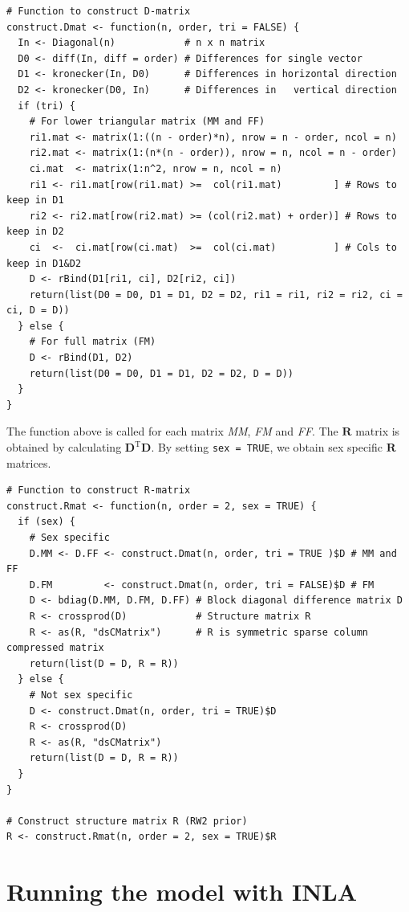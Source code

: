 \documentclass[aoas,preprint]{imsart}
\numberwithin{equation}{section}
\begin{document}
\begin{verbatim}
# Function to construct D-matrix
construct.Dmat <- function(n, order, tri = FALSE) {
  In <- Diagonal(n)            # n x n matrix
  D0 <- diff(In, diff = order) # Differences for single vector
  D1 <- kronecker(In, D0)      # Differences in horizontal direction
  D2 <- kronecker(D0, In)      # Differences in   vertical direction
  if (tri) {
    # For lower triangular matrix (MM and FF)
    ri1.mat <- matrix(1:((n - order)*n), nrow = n - order, ncol = n)
    ri2.mat <- matrix(1:(n*(n - order)), nrow = n, ncol = n - order)
    ci.mat  <- matrix(1:n^2, nrow = n, ncol = n)
    ri1 <- ri1.mat[row(ri1.mat) >=  col(ri1.mat)         ] # Rows to keep in D1
    ri2 <- ri2.mat[row(ri2.mat) >= (col(ri2.mat) + order)] # Rows to keep in D2
    ci  <-  ci.mat[row(ci.mat)  >=  col(ci.mat)          ] # Cols to keep in D1&D2
    D <- rBind(D1[ri1, ci], D2[ri2, ci])
    return(list(D0 = D0, D1 = D1, D2 = D2, ri1 = ri1, ri2 = ri2, ci = ci, D = D))
  } else {
    # For full matrix (FM)
    D <- rBind(D1, D2)
    return(list(D0 = D0, D1 = D1, D2 = D2, D = D))
  }
}
\end{verbatim}

The function above is called for each matrix \textit{MM}, \textit{FM} and \textit{FF}. The $\bm{R}$ matrix is obtained by calculating $\bm{D}^\text{T}\bm{D}$. By setting \texttt{sex = TRUE}, we obtain sex specific $\bm{R}$ matrices.

\begin{verbatim}
# Function to construct R-matrix
construct.Rmat <- function(n, order = 2, sex = TRUE) {
  if (sex) {
    # Sex specific
    D.MM <- D.FF <- construct.Dmat(n, order, tri = TRUE )$D # MM and FF
    D.FM         <- construct.Dmat(n, order, tri = FALSE)$D # FM
    D <- bdiag(D.MM, D.FM, D.FF) # Block diagonal difference matrix D
    R <- crossprod(D)            # Structure matrix R
    R <- as(R, "dsCMatrix")      # R is symmetric sparse column compressed matrix
    return(list(D = D, R = R))
  } else {
    # Not sex specific
    D <- construct.Dmat(n, order, tri = TRUE)$D
    R <- crossprod(D)
    R <- as(R, "dsCMatrix")
    return(list(D = D, R = R))
  }
}

# Construct structure matrix R (RW2 prior)
R <- construct.Rmat(n, order = 2, sex = TRUE)$R
\end{verbatim}

\section{Running the model with INLA}
\end{document}
